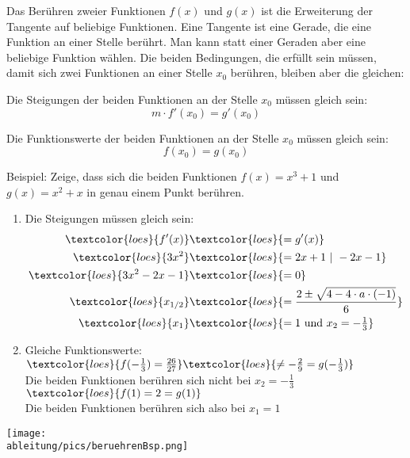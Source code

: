 Das Berühren zweier Funktionen \(f(x)\) und \(g(x)\) ist die Erweiterung der Tangente auf beliebige Funktionen. Eine Tangente ist eine Gerade, die eine Funktion an einer Stelle berührt. Man kann statt einer Geraden aber eine beliebige Funktion wählen. Die beiden Bedingungen, die erfüllt sein müssen, damit sich zwei Funktionen an einer Stelle \(x_0\) berühren, bleiben aber die gleichen:
\begin{tcolorbox}
	\textcolor{loestc}{Die Steigungen der beiden Funktionen an der Stelle \(x_0\) müssen gleich sein:
		\[m\cdot f'(x_0)=g'(x_0)\]}
\end{tcolorbox}
\begin{tcolorbox}
	\textcolor{loestc}{Die Funktionswerte der beiden Funktionen an der Stelle \(x_0\) müssen gleich sein:
		\[f(x_0)=g(x_0)\]}
\end{tcolorbox}
Beispiel: Zeige, dass sich die beiden Funktionen \(f(x)=x^3+1\) und \(g(x)=x^2+x\) in genau einem Punkt berühren.\vspace{0.5cm}\\
\begin{minipage}{\textwidth}
	\begin{minipage}{0.5\textwidth}
		\begin{enumerate}
			\item Die Steigungen müssen gleich sein:
			\begin{align*}
				\textcolor{loes}{f'(x)}&\textcolor{loes}{=g'(x)}\\
				\textcolor{loes}{3x^2}&\textcolor{loes}{=2x+1\ \vert\ -2x-1}\\
				\textcolor{loes}{3x^2-2x-1}&\textcolor{loes}{=0}\\
				\textcolor{loes}{x_{1/2}}&\textcolor{loes}{=\frac{2\pm\sqrt{4-4\cdot a\cdot (-1)}}{6}}\\
				\textcolor{loes}{x_1}&\textcolor{loes}{=1\text{ und }x_2=-\tfrac{1}{3}}\\
			\end{align*}
			\item Gleiche Funktionswerte:\\
			\(\textcolor{loes}{f(-\tfrac{1}{3})=\frac{26}{27}}\textcolor{loes}{\neq-\frac{2}{9}=g(-\tfrac{1}{3})}\)\\
			\textcolor{loes}{Die beiden Funktionen berühren sich nicht bei \(x_2=-\tfrac{1}{3}\)\\
				\(\textcolor{loes}{f(1)=2=g(1)}\)}\\
			\textcolor{loes}{Die beiden Funktionen berühren sich also bei \(x_1=1\)}
		\end{enumerate}
	\end{minipage}
	\begin{minipage}{0.5\textwidth}
		\centering\texttt{[image: \\ableitung/pics/beruehrenBsp.png]}
	\end{minipage}
\end{minipage}\\ \\
